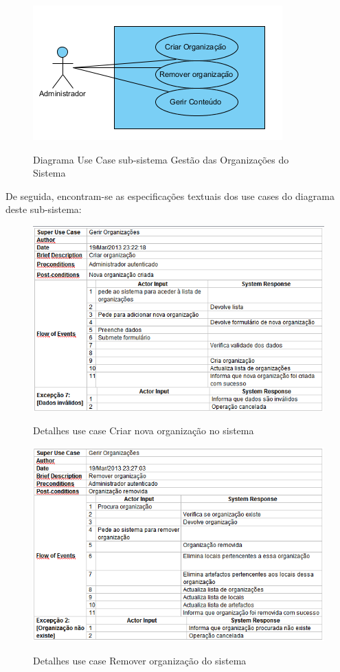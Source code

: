 \documentclass[12pt,a4paper]{article}
\begin{document}
\begin{figure}[h!]
\centering
\includegraphics[scale=1]{usecase/A_GerirOrganizacoes}
\label{usecase}
\caption{Diagrama Use Case sub-sistema Gestão das Organizações do Sistema}
\end{figure}

De seguida, encontram-se as especificações textuais dos use cases do diagrama deste sub-sistema:\\

\begin{figure}[h!]
\centering
\includegraphics[scale=0.7]{d_usecase/A_criarorganizacao}
\label{usecase}
\caption{Detalhes use case Criar nova organização no sistema}
\end{figure}

\begin{figure}[h!]
\centering
\includegraphics[scale=0.7]{d_usecase/A_removerorganizacao}
\label{usecase}
\caption{Detalhes use case Remover organização do sistema}
\end{figure}
\end{document}
